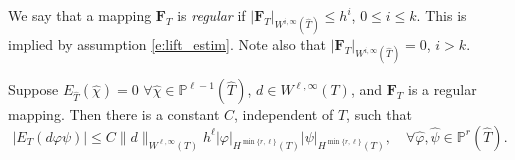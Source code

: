 \documentclass{siamart0516}
\newcommand{\bF}{\ensuremath{\boldsymbol F}}
\numberwithin{equation}{section}
\numberwithin{theorem}{section}
\numberwithin{figure}{section}
\begin{document}
We say that a mapping $\bF_T$ is {\it regular} if $|\bF_T|_{W^{i,\infty}(\hat{T})}\leq h^i$, $0 \le i \le k$. This is implied by assumption \eqref{e:lift_estim}.  Note also that $|\bF_T|_{W^{i,\infty}(\hat{T})}=0$, $i >k$.  
\begin{lemma}\label{QuadBound}
Suppose $E_{\hat{T}}(\hat{\chi})=0$ $\forall \hat{\chi}\in \mathbb{P}^{\ell-1}(\hat{T})$, $d\in W^{\ell,\infty}(T)$, and $\bF_T$ is a regular mapping. Then there is a constant $C$, independent of $T$, such that
\begin{equation}
	|E_T(d\varphi\psi)|\leq C\|d\|_{W^{\ell,\infty}(T)}h^{\ell}|\varphi|_{H^{\min\{r,\ell\}}(T)}|\psi|_{H^{\min\{r,\ell\}}(T)}, \quad \forall \hat{\varphi},\hat{\psi}\in\mathbb{P}^r(\hat{T}).
\end{equation}
\end{lemma}
\end{document}
